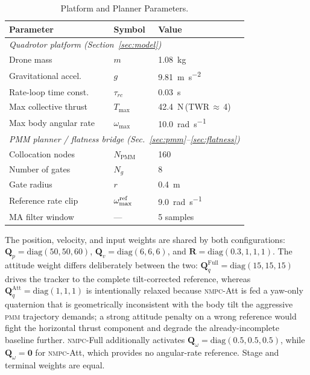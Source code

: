 \documentclass{ieeeaccess}
\newcommand{\mat}[1]{\mathbf{#1}}
\newcommand{\pmm}{\textsc{pmm}}
\newcommand{\nmpc}{\textsc{nmpc}}
\begin{document}
\begin{table}[!htbp]
  \centering
  \caption{Platform and Planner Parameters.}
  \label{tab:params_left}
  \begin{tabular}{lll}
    \toprule
    Parameter & Symbol & Value \\
    \midrule
    \multicolumn{3}{l}{\textit{Quadrotor platform
                               (Section~\ref{sec:model})}} \\
    \midrule
    Drone mass            & $m$             & \SI{1.08}{\kg} \\
    Gravitational accel.  & $g$             & \SI{9.81}{\metre\per\second\squared} \\
    Rate-loop time const. & $\tau_{rc}$     & \SI{0.03}{\s} \\
    Max collective thrust & $T_{\max}$      & \SI{42.4}{\N}\,(TWR\,$\approx$\,4) \\
    Max body angular rate & $\omega_{\max}$ & \SI{10.0}{\radian\per\second} \\
    \midrule
    \multicolumn{3}{l}{\textit{PMM planner / flatness bridge
                               (Sec.~\ref{sec:pmm}--\ref{sec:flatness})}} \\
    \midrule
    Collocation nodes   & $N_\text{PMM}$            & 160 \\
    Number of gates     & $N_g$                     & 8 \\
    Gate radius         & $r$                       & \SI{0.4}{\m} \\
    Reference rate clip & $\omega_{\max}^{\rm ref}$ & \SI{9.0}{\radian\per\second} \\
    MA filter window    & ---                       & 5 samples \\
    \bottomrule
  \end{tabular}
\end{table}

The position, velocity, and input weights are shared by both
configurations:
$\mat{Q}_p = \mathrm{diag}(50,50,60)$,
$\mat{Q}_v = \mathrm{diag}(6,6,6)$, and
$\mat{R} = \mathrm{diag}(0.3,1,1,1)$.
The attitude weight differs deliberately between the two:
$\mat{Q}_q^{\text{Full}} = \mathrm{diag}(15,15,15)$ drives the tracker
to the complete tilt-corrected reference, whereas
$\mat{Q}_q^{\text{Att}} = \mathrm{diag}(1,1,1)$ is intentionally
relaxed because \nmpc{}-Att is fed a yaw-only quaternion that is
geometrically inconsistent with the body tilt the aggressive \pmm{}
trajectory demands; a strong attitude penalty on a wrong reference
would fight the horizontal thrust component and degrade the
already-incomplete baseline further.
\nmpc{}-Full additionally activates
$\mat{Q}_\omega = \mathrm{diag}(0.5,0.5,0.5)$, while
$\mat{Q}_\omega=\mat{0}$ for \nmpc{}-Att, which provides no
angular-rate reference.
Stage and terminal weights are equal.
\end{document}
